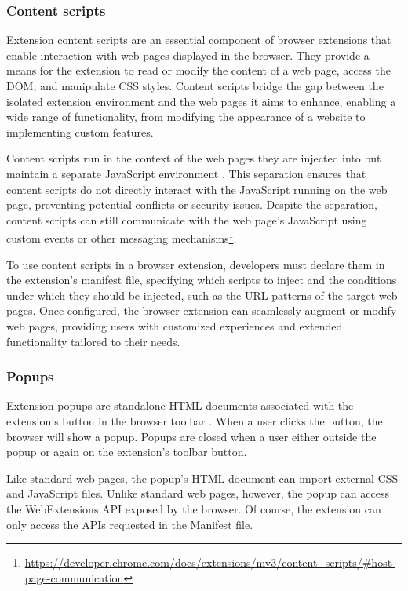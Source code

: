 \subsubsection{Content scripts}

Extension content scripts are an essential component of browser extensions that enable interaction with web pages displayed in the browser. They provide a means for the extension to read or modify the content of a web page, access the DOM, and manipulate CSS styles. Content scripts bridge the gap between the isolated extension environment and the web pages it aims to enhance, enabling a wide range of functionality, from modifying the appearance of a website to implementing custom features.

Content scripts run in the context of the web pages they are injected into but maintain a separate JavaScript environment \cite{ChromeWebExtensions}. This separation ensures that content scripts do not directly interact with the JavaScript running on the web page, preventing potential conflicts or security issues. Despite the separation, content scripts can still communicate with the web page's JavaScript using custom events or other messaging mechanisms\footnote{\url{https://developer.chrome.com/docs/extensions/mv3/content_scripts/\#host-page-communication}}.

To use content scripts in a browser extension, developers must declare them in the extension's manifest file, specifying which scripts to inject and the conditions under which they should be injected, such as the URL patterns of the target web pages. Once configured, the browser extension can seamlessly augment or modify web pages, providing users with customized experiences and extended functionality tailored to their needs.

\subsubsection{Popups}

Extension popups are standalone HTML documents associated with the extension's button in the browser toolbar \cite{ChromeWebExtensions}. When a user clicks the button, the browser will show a popup. Popups are closed when a user either outside the popup or again on the extension's toolbar button.

Like standard web pages, the popup's HTML document can import external CSS and JavaScript files. Unlike standard web pages, however, the popup can access the WebExtensions API exposed by the browser. Of course, the extension can only access the APIs requested in the Manifest file.

